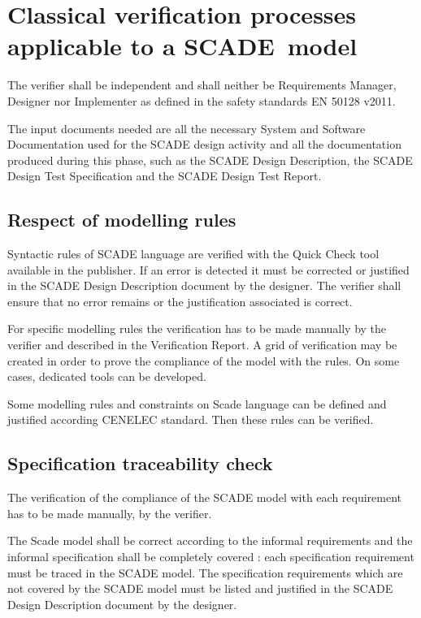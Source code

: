 \section{Classical verification processes applicable to a SCADE~model}

The verifier shall be independent and shall neither be Requirements Manager, Designer nor Implementer as defined in the safety standards EN 50128 v2011.

The input documents needed are all the necessary System and Software Documentation used for the SCADE design activity and all the documentation produced during this phase, such as the SCADE Design Description, the SCADE Design Test Specification and the SCADE Design Test Report.

\subsection{Respect of modelling rules}

Syntactic rules of SCADE language are verified with the Quick Check tool available in the publisher. If an error is detected it must be corrected or justified in the SCADE Design Description document by the designer. The verifier shall ensure that no error remains or the justification associated is correct.

For specific modelling rules the verification has to be made manually by the verifier and described in the Verification Report. A grid of verification may be created in order to prove the compliance of the model with the rules. On some cases, dedicated tools can be developed.

Some modelling rules and constraints on Scade language can be defined and justified according CENELEC standard. Then these rules can be verified.

\subsection{Specification traceability check}

The verification of the compliance of the SCADE model with each requirement has to be made manually, by the verifier. 

The Scade model shall be correct according to the informal requirements and the informal specification shall be completely covered : each specification requirement must be traced in the SCADE model. The specification requirements which are not covered by the SCADE model must be listed and justified in the SCADE Design Description document by the designer.

